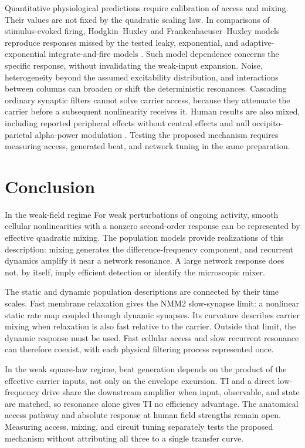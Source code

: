 \documentclass[11pt,a4paper]{article}
\providecommand{\DIFaddtex}[1]{{\protect\color{blue} \sf #1}} %
\providecommand{\DIFdeltex}[1]{{\protect\color{red} \scriptsize #1}} %
\providecommand{\DIFaddbegin}{} %
\providecommand{\DIFaddend}{} %
\providecommand{\DIFdelbegin}{} %
\providecommand{\DIFdelend}{} %
\providecommand{\DIFadd}[1]{\texorpdfstring{\DIFaddtex{#1}}{#1}} %
\providecommand{\DIFdel}[1]{\texorpdfstring{\DIFdeltex{#1}}{}} %
\begin{document}
Quantitative physiological predictions require calibration of access and mixing.
Their values are not fixed by the quadratic scaling law. In comparisons of
stimulus-evoked firing, Hodgkin--Huxley and Frankenhaeuser--Huxley models reproduce
responses missed by the tested leaky, exponential, and adaptive-exponential
integrate-and-fire models \cite{plovie2025}. Such model dependence concerns the
specific response, without invalidating the weak-input expansion. Noise,
heterogeneity beyond the assumed excitability distribution, and interactions
between columns can broaden or shift the deterministic resonances. Cascading
ordinary synaptic filters cannot solve carrier access, because they attenuate
the carrier before a subsequent nonlinearity receives it. Human results are also
mixed, including reported peripheral effects without central effects
\cite{iszak2023} and null occipito-parietal alpha-power modulation
\cite{mansourinezhad2025}. Testing the proposed mechanism requires measuring
access, generated beat, and network tuning in the same preparation.

\section{Conclusion}
\DIFdelbegin \DIFdel{In the weak-field regime}\DIFdelend \DIFaddbegin \DIFadd{For weak perturbations of ongoing activity}\DIFaddend , smooth cellular nonlinearities with a nonzero
second-order response can be represented by effective quadratic mixing. The
population models provide realizations of this description: mixing generates
the difference-frequency component, and recurrent dynamics amplify it near a
network resonance. A large network response does not, by itself, imply efficient
detection or identify the microscopic mixer.

The static and dynamic population descriptions are connected by their time scales.
Fast membrane relaxation gives the NMM2 slow-synapse limit: a nonlinear static rate
map coupled through dynamic synapses. Its curvature describes carrier mixing when
relaxation is also fast relative to the carrier. Outside that limit, the dynamic
response must be used. Fast cellular access and slow recurrent resonance can
therefore coexist, with each physical filtering process represented once.

In the weak square-law regime, beat generation depends on the product of the
effective carrier inputs, not only on the envelope excursion. TI and a direct
low-frequency drive share the downstream amplifier when input, observable, and
state are matched, so resonance alone gives TI no efficiency advantage. The
anatomical access pathway and absolute response at human field strengths remain
open. Measuring access, mixing, and circuit tuning separately tests the proposed
mechanism without attributing all three to a single transfer curve.
\end{document}
